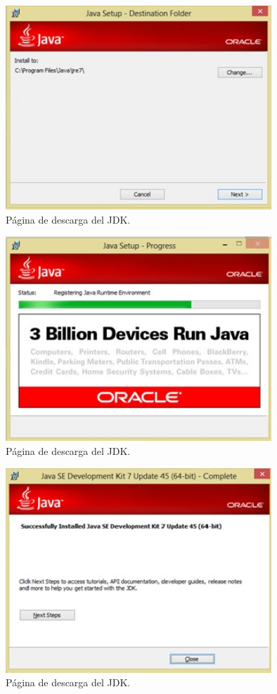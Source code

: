 \documentclass[12pt]{book} %
\begin{document}
\begin{enumerate}
\begin{figure}[!hbp]
	\end{figure}
	\begin{figure}[!hbp]
		\centering
			\includegraphics[width=10cm]{ins6.jpg}
			\caption{Página de descarga del JDK.}
		
	\end{figure}
	\begin{figure}[!hbp]
		\centering
			\includegraphics[width=10cm]{ins7.jpg}
			\caption{Página de descarga del JDK.}
		
	\end{figure}
	\begin{figure}[!hbp]
		\centering
			\includegraphics[width=10cm]{ins8.jpg}
			\caption{Página de descarga del JDK.}
			\label{fin}
	\end{figure}
	


\end{enumerate}
\end{document}
